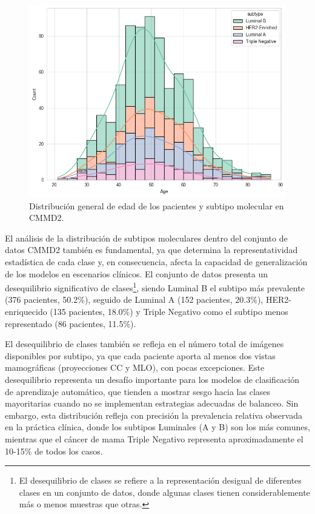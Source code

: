 \documentclass[a4paper,10pt]{book}
\begin{document}
\begin{figure}[h!]
\centering
\includegraphics[width=0.5\linewidth]{reports//assets/age_dist.png}
\caption[Distribución de edad en CMMD2]{Distribución general de edad de los pacientes y subtipo molecular en CMMD2.}
\label{fig:age_dist_all}
\end{figure}

El análisis de la distribución de subtipos moleculares dentro del conjunto de datos CMMD2 también es fundamental, ya que determina la representatividad estadística de cada clase y, en consecuencia, afecta la capacidad de generalización de los modelos en escenarios clínicos. El conjunto de datos presenta un desequilibrio significativo de clases\footnote{El desequilibrio de clases se refiere a la representación desigual de diferentes clases en un conjunto de datos, donde algunas clases tienen considerablemente más o menos muestras que otras.}, siendo Luminal B el subtipo más prevalente (376 pacientes, 50.2\%), seguido de Luminal A (152 pacientes, 20.3\%), HER2-enriquecido (135 pacientes, 18.0\%) y Triple Negativo como el subtipo menos representado (86 pacientes, 11.5\%).

El desequilibrio de clases también se refleja en el número total de imágenes disponibles por subtipo, ya que cada paciente aporta al menos dos vistas mamográficas (proyecciones CC y MLO), con pocas excepciones. Este desequilibrio representa un desafío importante para los modelos de clasificación de aprendizaje automático, que tienden a mostrar sesgo hacia las clases mayoritarias cuando no se implementan estrategias adecuadas de balanceo. Sin embargo, esta distribución refleja con precisión la prevalencia relativa observada en la práctica clínica, donde los subtipos Luminales (A y B) son los más comunes, mientras que el cáncer de mama Triple Negativo representa aproximadamente el 10-15\% de todos los casos.
\end{document}
